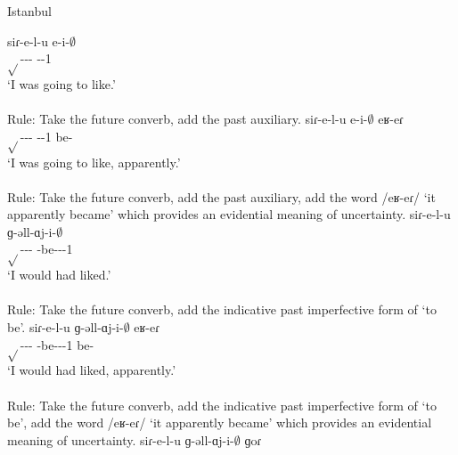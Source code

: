\begin{adjarianpage}\label{page:254}\end{adjarianpage}%





\begin{exe}
	\ex Istanbul \label{sent:Istanbul:morpho:verb:complex:futcvb:pst}
	\begin{xlist}
		\ex \gll siɾ-e-l-u e-i-$\emptyset$ \\
		$\sqrt{}$-{\thgloss}-{\infgloss}-{\futcvb} {\aux}-{\pst}-1{\sg} \\
		\trans `I was going to like.' \\
		 \\
		Rule: Take the future converb, add the past auxiliary.
		\ex \gll siɾ-e-l-u e-i-$\emptyset$ eʁ-eɾ \\
		$\sqrt{}$-{\thgloss}-{\infgloss}-{\futcvb} {\aux}-{\pst}-1{\sg} be-{\eptcp} \\
		\trans `I was going to like, apparently.' \\
		 \\
		Rule: Take the future converb, add the past auxiliary, add the word /eʁ-eɾ/ `it apparently became' which provides an evidential meaning of uncertainty.
		\ex \gll siɾ-e-l-u ɡ-əll-ɑj-i-$\emptyset$ \\
		$\sqrt{}$-{\thgloss}-{\infgloss}-{\futcvb} {\ind}-be-{\thgloss}-{\pst}-1{\sg} \\
		\trans `I would had liked.' \\
		 \\
		Rule: Take the future converb, add the indicative past imperfective form of `to be'.
		\ex \gll siɾ-e-l-u ɡ-əll-ɑj-i-$\emptyset$ eʁ-eɾ \\
		$\sqrt{}$-{\thgloss}-{\infgloss}-{\futcvb} {\ind}-be-{\thgloss}-{\pst}-1{\sg} be-{\eptcp} \\
		\trans `I would had liked, apparently.' \\
		 \\
		Rule: Take the future converb, add the indicative past imperfective form of `to be', add the word /eʁ-eɾ/ `it apparently became' which provides an evidential meaning of uncertainty.
		\ex \gll siɾ-e-l-u ɡ-əll-ɑj-i-$\emptyset$ ɡoɾ \\

\end{xlist}
\end{exe}
